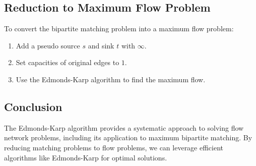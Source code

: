 \subsection{Reduction to Maximum Flow Problem}
\begin{process}
    To convert the bipartite matching problem into a maximum flow problem:
    \begin{enumerate}
        \item Add a pseudo source $s$ and sink $t$ with $\infty$.
        \item Set capacities of original edges to $1$.
        \item Use the Edmonds-Karp algorithm to find the maximum flow.
    \end{enumerate}
\end{process}

\subsection{Conclusion}
\begin{summary}
    The Edmonds-Karp algorithm provides a systematic approach to solving flow network problems, including its application to maximum bipartite matching. By reducing matching problems to flow problems, we can leverage efficient algorithms like Edmonds-Karp for optimal solutions.
\end{summary}